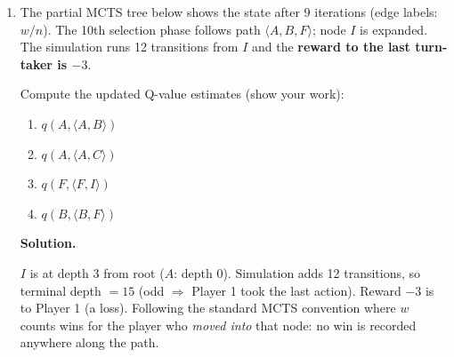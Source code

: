 \documentclass[12pt]{article}
\newenvironment{solution}{%
  \ifshowsolutions\begin{solutionbox}\noindent\textbf{\color{blue!70!black}Solution.}\quad\fi
  \ifshowsolutions\else\expandafter\comment\fi
}{%
  \ifshowsolutions\end{solutionbox}\fi
  \ifshowsolutions\else\expandafter\endcomment\fi
}
\begin{document}
\begin{enumerate}
\begin{enumerate}
  \item The partial MCTS tree below shows the state after 9 iterations (edge labels: $w/n$). The 10th selection phase follows path $\langle A, B, F \rangle$; node $I$ is expanded. The simulation runs 12 transitions from $I$ and the \textbf{reward to the last turn-taker is $-3$}.

  \begin{figure}[H]
    \centering
  \end{figure}

  Compute the updated Q-value estimates (show your work):
  \begin{enumerate}
    \item $q(A, \langle A,B\rangle)$
    \item $q(A, \langle A,C\rangle)$
    \item $q(F, \langle F,I\rangle)$
    \item $q(B, \langle B,F\rangle)$
  \end{enumerate}

  \begin{solution}
    $I$ is at depth 3 from root ($A$: depth 0). Simulation adds 12 transitions, so terminal depth $=15$ (odd $\Rightarrow$ Player 1 took the last action). Reward $-3$ is to Player 1 (a loss). Following the standard MCTS convention where $w$ counts wins for the player who \emph{moved into} that node: no win is recorded anywhere along the path.


\end{solution}
\end{enumerate}
\end{enumerate}
\end{document}
